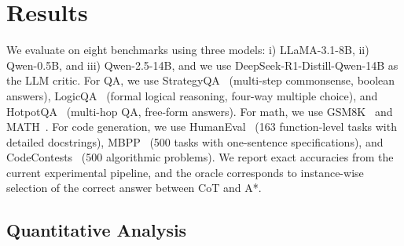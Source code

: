 \documentclass[11pt]{article}
\begin{document}
\section{Results}
\label{sec:results}

We evaluate on eight benchmarks using three models: i) LLaMA-3.1-8B, ii) Qwen-0.5B, and iii) Qwen-2.5-14B, and we use DeepSeek-R1-Distill-Qwen-14B as the LLM critic. For QA, we use StrategyQA~\cite{geva2021did} (multi-step commonsense, boolean answers), LogicQA~\cite{liu2020logiqa} (formal logical reasoning, four-way multiple choice), and HotpotQA~\cite{yang2018hotpotqa} (multi-hop QA, free-form answers). For math, we use GSM8K~\cite{cobbe2021trainingverifierssolvemath} and MATH~\cite{hendrycks2021measuringmathematicalproblemsolving}. For code generation, we use HumanEval~\cite{chen2021humaneval} (163 function-level tasks with detailed docstrings), MBPP~\cite{austin2021mbpp} (500 tasks with one-sentence specifications), and CodeContests~\cite{li2022codecontests} (500 algorithmic problems). We report exact accuracies from the current experimental pipeline, and the oracle corresponds to instance-wise selection of the correct answer between CoT and A*.

\subsection{Quantitative Analysis}
\label{sec:quantitative}



\end{document}
